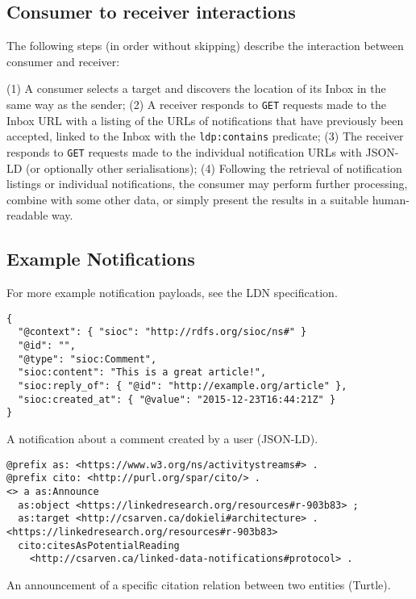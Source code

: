 \documentclass[a4paper]{llncs}
\begin{document}
                                \subsection{Consumer to receiver interactions}
  \label{consumer-to-receiver}



\par The following steps (in order without skipping) describe the interaction between consumer and receiver:


\par (1) A consumer selects a target and discovers the location of its Inbox in the same way as the sender; (2) A receiver responds to {\tt GET} requests made to the Inbox URL with a listing of the URLs of notifications that have previously been accepted, linked to the Inbox with the {\tt ldp:contains} predicate; (3) The receiver responds to {\tt GET} requests made to the individual notification URLs with JSON-LD (or optionally other serialisations); (4) Following the retrieval of notification listings or individual notifications, the consumer may perform further processing, combine with some other data, or simply present the results in a suitable human-readable way.




                                \subsection{Example Notifications}
  \label{example-notifications}



\par For more example notification payloads, see the \empty LDN specification.


                                        \begin{verbatim}{
  "@context": { "sioc": "http://rdfs.org/sioc/ns#" }
  "@id": "",
  "@type": "sioc:Comment",
  "sioc:content": "This is a great article!",
  "sioc:reply_of": { "@id": "http://example.org/article" },
  "sioc:created_at": { "@value": "2015-12-23T16:44:21Z" }
}\end{verbatim}
                                        A notification about a comment created by a user (JSON-LD).



                                        \begin{verbatim}@prefix as: <https://www.w3.org/ns/activitystreams#> .
@prefix cito: <http://purl.org/spar/cito/> .
<> a as:Announce
  as:object <https://linkedresearch.org/resources#r-903b83> ;
  as:target <http://csarven.ca/dokieli#architecture> .
<https://linkedresearch.org/resources#r-903b83>
  cito:citesAsPotentialReading
    <http://csarven.ca/linked-data-notifications#protocol> .\end{verbatim}
                                        An announcement of a specific citation relation between two entities (Turtle).
\end{document}
